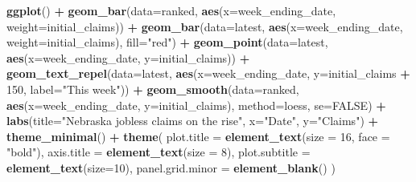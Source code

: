 \documentclass[]{book}
\newenvironment{Shaded}{\begin{snugshade}}{\end{snugshade}}
\newcommand{\DataTypeTok}[1]{\textcolor[rgb]{0.13,0.29,0.53}{#1}}
\newcommand{\DecValTok}[1]{\textcolor[rgb]{0.00,0.00,0.81}{#1}}
\newcommand{\KeywordTok}[1]{\textcolor[rgb]{0.13,0.29,0.53}{\textbf{#1}}}
\newcommand{\NormalTok}[1]{#1}
\newcommand{\OperatorTok}[1]{\textcolor[rgb]{0.81,0.36,0.00}{\textbf{#1}}}
\newcommand{\OtherTok}[1]{\textcolor[rgb]{0.56,0.35,0.01}{#1}}
\newcommand{\StringTok}[1]{\textcolor[rgb]{0.31,0.60,0.02}{#1}}
\begin{document}
\begin{Shaded}
\begin{Highlighting}[]
\KeywordTok{ggplot}\NormalTok{() }\OperatorTok{+}\StringTok{ }
\StringTok{  }\KeywordTok{geom_bar}\NormalTok{(}\DataTypeTok{data=}\NormalTok{ranked, }\KeywordTok{aes}\NormalTok{(}\DataTypeTok{x=}\NormalTok{week_ending_date, }\DataTypeTok{weight=}\NormalTok{initial_claims)) }\OperatorTok{+}
\StringTok{  }\KeywordTok{geom_bar}\NormalTok{(}\DataTypeTok{data=}\NormalTok{latest, }\KeywordTok{aes}\NormalTok{(}\DataTypeTok{x=}\NormalTok{week_ending_date, }\DataTypeTok{weight=}\NormalTok{initial_claims), }\DataTypeTok{fill=}\StringTok{"red"}\NormalTok{) }\OperatorTok{+}
\StringTok{  }\KeywordTok{geom_point}\NormalTok{(}\DataTypeTok{data=}\NormalTok{latest, }\KeywordTok{aes}\NormalTok{(}\DataTypeTok{x=}\NormalTok{week_ending_date, }\DataTypeTok{y=}\NormalTok{initial_claims)) }\OperatorTok{+}\StringTok{ }
\StringTok{  }\KeywordTok{geom_text_repel}\NormalTok{(}\DataTypeTok{data=}\NormalTok{latest, }\KeywordTok{aes}\NormalTok{(}\DataTypeTok{x=}\NormalTok{week_ending_date, }\DataTypeTok{y=}\NormalTok{initial_claims }\OperatorTok{+}\StringTok{ }\DecValTok{150}\NormalTok{, }\DataTypeTok{label=}\StringTok{"This week"}\NormalTok{)) }\OperatorTok{+}\StringTok{ }
\StringTok{  }\KeywordTok{geom_smooth}\NormalTok{(}\DataTypeTok{data=}\NormalTok{ranked, }\KeywordTok{aes}\NormalTok{(}\DataTypeTok{x=}\NormalTok{week_ending_date, }\DataTypeTok{y=}\NormalTok{initial_claims), }\DataTypeTok{method=}\NormalTok{loess, }\DataTypeTok{se=}\OtherTok{FALSE}\NormalTok{) }\OperatorTok{+}\StringTok{ }
\StringTok{  }\KeywordTok{labs}\NormalTok{(}\DataTypeTok{title=}\StringTok{"Nebraska jobless claims on the rise"}\NormalTok{, }\DataTypeTok{x=}\StringTok{"Date"}\NormalTok{, }\DataTypeTok{y=}\StringTok{"Claims"}\NormalTok{) }\OperatorTok{+}
\StringTok{  }\KeywordTok{theme_minimal}\NormalTok{() }\OperatorTok{+}\StringTok{ }
\StringTok{  }\KeywordTok{theme}\NormalTok{(}
    \DataTypeTok{plot.title =} \KeywordTok{element_text}\NormalTok{(}\DataTypeTok{size =} \DecValTok{16}\NormalTok{, }\DataTypeTok{face =} \StringTok{"bold"}\NormalTok{),}
    \DataTypeTok{axis.title =} \KeywordTok{element_text}\NormalTok{(}\DataTypeTok{size =} \DecValTok{8}\NormalTok{), }
    \DataTypeTok{plot.subtitle =} \KeywordTok{element_text}\NormalTok{(}\DataTypeTok{size=}\DecValTok{10}\NormalTok{), }
    \DataTypeTok{panel.grid.minor =} \KeywordTok{element_blank}\NormalTok{()}
\NormalTok{    )}
\end{Highlighting}
\end{Shaded}
\end{document}
